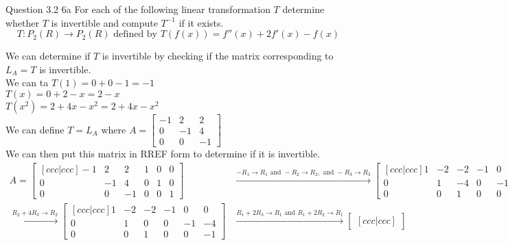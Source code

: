 \documentclass[answers,12pt,addpoints]{exam}
\begin{document}
\begin{questions}
    \question Question 3.2 6a
    For each of the following linear transformation $T$ determine whether $T$ is invertible and compute $T^{-1}$ if it exists.\\
    $$ T: P_2(R) \to P_2(R) \text{ defined by } T(f(x)) = f''(x) + 2f'(x) - f(x)$$
    \begin{solution}
        We can determine if $T$ is invertible by checking if the matrix corresponding to $L_A = T$ is invertible.\\
        We can ta
        $T(1) = 0 + 0 - 1 = -1$\\
        $T(x) = 0 + 2 - x = 2 - x$\\
        $T(x^2) = 2 + 4x - x^2 = 2 + 4x - x^2$\\
        We can define $ T = L_A$ where $A = \begin{bmatrix}
            -1 & 2 & 2\\
            0 & -1 & 4\\
            0 & 0 & -1
        \end{bmatrix}$\\
        We can then put this matrix in RREF form to determine if it is invertible.\\
        \begin{align*}
            A = \begin{bmatrix}[ccc|ccc]
                -1 & 2 & 2 & 1 & 0 & 0\\
                0 & -1 & 4 & 0 & 1 & 0\\
                0 & 0 & -1 & 0 & 0 & 1
            \end{bmatrix} &\xrightarrow{-R_1 \to R_1 \text{ and } -R_2 \to R_2, \text{ and } -R_3 \to R_3} \begin{bmatrix}[ccc|ccc]
                1 & -2 & -2 & -1 & 0 & 0\\
                0 & 1 & -4 & 0 & -1 & 0\\
                0 & 0 & 1 & 0 & 0 & -1
            \end{bmatrix}\\
            \xrightarrow{R_2 + 4R_3 \to R_2} \begin{bmatrix}[ccc|ccc]
                1 & -2 & -2 & -1 & 0 & 0\\
                0 & 1 & 0 & 0 & -1 & -4\\
                0 & 0 & 1 & 0 & 0 & -1
            \end{bmatrix} &\xrightarrow{R_1 + 2R_3 \to R_1 \text{ and } R_1 + 2R_2 \to R_1} \begin{bmatrix}[ccc|ccc]

\end{bmatrix}
\end{align*}
\end{solution}
\end{questions}
\end{document}

